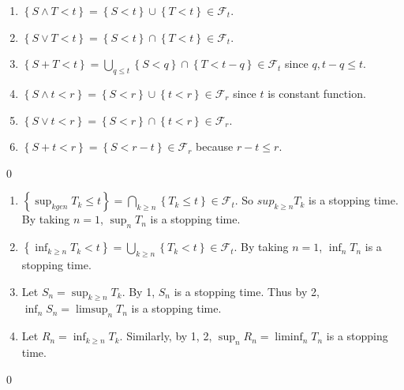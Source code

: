 \begin{problem}[7.3.2] \hfill

	\begin{enumerate}
		\item $\left\{ S \wedge T < t \right\} = \left\{ S < t  \right\} \cup \left\{ T < t \right\} \in \mathcal{F}_t$.

		\item $\left\{ S \vee T < t \right\} = \left\{ S < t \right\} \cap \left\{ T < t \right\} \in \mathcal{F}_t$.
	
		\item $\left\{ S + T < t \right \} = \bigcup_{q \le t} \left\{ S < q \right\} \cap \left\{ T< t-q \right\} \in \mathcal{F}_t$ since $q , t-q \le t$.

		\item $\left\{ S \wedge t < r \right\} = \left\{ S < r \right\} \cup \left\{ t < r \right\} \in \mathcal{F}_r$ since $t$ is constant function.

		\item $\left\{ S \vee t < r \right\} = \left\{ S < r \right\} \cap \left\{ t < r \right\} \in \mathcal{F}_r$.

		\item $\left\{ S + t < r \right\} = \left\{ S < r-t \right\} \in \mathcal{F}_r$ because $r-t \le r$.
	\end{enumerate}

	\qed
\end{problem}

\begin{problem}[7.3.3] \hfill

	\begin{enumerate}
		\item $\left\{ \sup_{k ge n} T_k \le t \right\} = \bigcap_{k \ge n}\left\{ T_k \le t \right\} \in \mathcal{F}_t$. So $sup_{k \ge n} T_k$ is a stopping time.  By taking $n=1$, $\sup_n T_n$ is a stopping time.

		\item $\left\{ \inf_{k\ge n} T_k < t \right\} = \bigcup_{k \ge n} \left\{ T_k < t \right\} \in \mathcal{F}_t$. By taking $n=1$, $\inf_n T_n$ is a stopping time.

		\item Let $S_n = \sup_{k\ge n} T_k$.
			By 1, $S_n$ is a stopping time.
			Thus by 2, $\inf_n S_n = \limsup_n T_n$ is a stopping time.

		\item Let $R_n = \inf_{k \ge n}T_k$.
			Similarly, by 1, 2, $\sup_n R_n = \liminf_n T_n$ is a stopping time.
	\end{enumerate}
	
	\qed
\end{problem}

